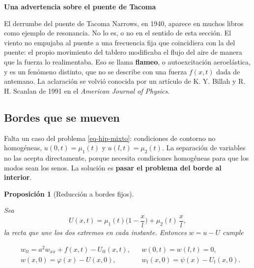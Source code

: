 \documentclass[
  spanish,
  a4paper,
]{scrbook}
\theoremstyle{definition}
\theoremstyle{plain}
\newtheorem{proposition}{Proposición}[chapter]
\theoremstyle{definition}
\theoremstyle{plain}
\theoremstyle{definition}
\theoremstyle{remark}
\begin{document}
\begin{tcolorbox}[enhanced jigsaw, arc=.35mm, bottomrule=.15mm, breakable, colback=white, colframe=quarto-callout-note-color-frame, left=2mm, leftrule=.75mm, opacityback=0, rightrule=.15mm, toprule=.15mm]
\begin{minipage}[t]{5.5mm}
\textcolor{quarto-callout-note-color}{\faInfo}
\end{minipage}%
\begin{minipage}[t]{\textwidth - 5.5mm}

\vspace{-3mm}\textbf{Una advertencia sobre el puente de Tacoma}\vspace{3mm}

El derrumbe del puente de Tacoma Narrows, en 1940, aparece en muchos
libros como ejemplo de resonancia. No lo es, o no en el sentido de esta
sección. El viento no empujaba al puente a una frecuencia fija que
coincidiera con la del puente: el propio movimiento del tablero
modificaba el flujo del aire de manera que la fuerza lo realimentaba.
Eso se llama \textbf{flameo}, o autoexcitación aeroelástica, y es un
fenómeno distinto, que no se describe con una fuerza \(f(x,t)\) dada de
antemano. La aclaración se volvió conocida por un artículo de K. Y.
Billah y R. H. Scanlan de 1991 en el \emph{American Journal of Physics}.

\end{minipage}%
\end{tcolorbox}

\subsection{Bordes que se mueven}\label{sec-hip-bordes-moviles}

Falta un caso del problema \ref{eq-hip-mixto}: condiciones de contorno
no homogéneas, \(u(0,t) = \mu_1(t)\) y \(u(l,t) = \mu_2(t)\). La
separación de variables no las acepta directamente, porque necesita
condiciones homogéneas para que los modos sean los senos. La solución es
\textbf{pasar el problema del borde al interior}.

\begin{proposition}[Reducción a bordes
fijos]\protect\hypertarget{prp-hip-bordes-moviles}{}\label{prp-hip-bordes-moviles}

Sea \[
U(x,t) = \mu_1(t)\Big(1 - \frac{x}{l}\Big) + \mu_2(t)\,\frac{x}{l},
\] la recta que une los dos extremos en cada instante. Entonces
\(w = u - U\) cumple

\[
\begin{aligned}
&w_{tt} = a^2w_{xx} + f(x,t) - U_{tt}(x,t), && w(0,t) = w(l,t) = 0,\\
&w(x,0) = \varphi(x) - U(x,0), && w_t(x,0) = \psi(x) - U_t(x,0).
\end{aligned}
\]

\end{proposition}
\end{document}
